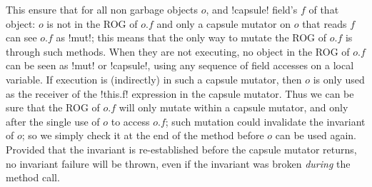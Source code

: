 \noindent This ensure that for all non garbage objects $o$, and \Q!capsule! field's $f$ of that object:
$o$ is not in the ROG of $o.f$ and
only a capsule mutator on $o$ that reads $f$ can see $o.f$ as \Q!mut!; this means that the only way to mutate the ROG of $o.f$ is through such methods. When they are not executing, no object in the ROG of $o.f$ can be seen as \Q!mut! or \Q!capsule!, using any sequence of field accesses on a local variable.
%
%
If execution is (indirectly) in such a capsule mutator, then $o$ is only used as the receiver of the \Q!this.f! expression in the capsule mutator.
Thus we can be sure that the ROG of $o.f$ will only mutate within a capsule mutator, and only after the single use of $o$ to access $o.f$; such mutation could invalidate the invariant of $o$; so we simply check it at the end of the method before $o$ can be used again. Provided that the invariant is re-established before the capsule mutator returns, no invariant failure will be thrown, even if the invariant was broken \emph{during} the method call.

